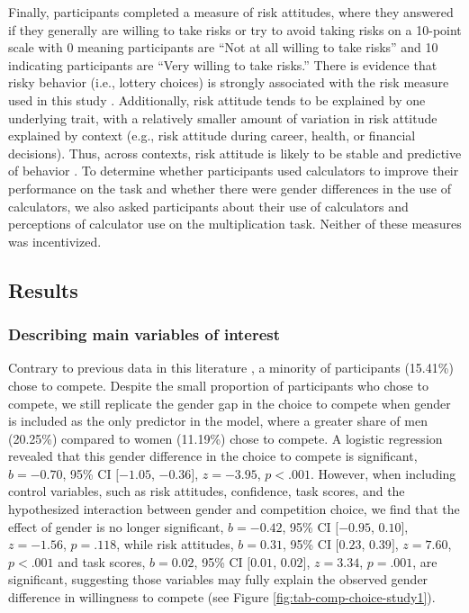 \documentclass[a4paper, nobind]{templates/ociamthesis}
\begin{document}
Finally, participants completed a measure of risk attitudes, where they answered if they generally are willing to take risks or try to avoid taking risks \autocite{Dohmen2011b} on a 10-point scale with 0 meaning participants are ``Not at all willing to take risks'' and 10 indicating participants are ``Very willing to take risks.'' There is evidence that risky behavior (i.e., lottery choices) is strongly associated with the risk measure used in this study \autocite{Dohmen2011b}. Additionally, risk attitude tends to be explained by one underlying trait, with a relatively smaller amount of variation in risk attitude explained by context (e.g., risk attitude during career, health, or financial decisions). Thus, across contexts, risk attitude is likely to be stable and predictive of behavior \autocite{Dohmen2011b}. To determine whether participants used calculators to improve their performance on the task and whether there were gender differences in the use of calculators, we also asked participants about their use of calculators and perceptions of calculator use on the multiplication task. Neither of these measures was incentivized.

\hypertarget{results}{%
\subsection{Results}\label{results}}

\hypertarget{describing-main-variables-of-interest}{%
\subsubsection{Describing main variables of interest}\label{describing-main-variables-of-interest}}

Contrary to previous data in this literature \autocite{Niederle2007}, a minority of participants (15.41\%) chose to compete. Despite the small proportion of participants who chose to compete, we still replicate the gender gap in the choice to compete when gender is included as the only predictor in the model, where a greater share of men (20.25\%) compared to women (11.19\%) chose to compete. A logistic regression revealed that this gender difference in the choice to compete is significant, \(b = -0.70\), 95\% CI \([-1.05\), \(-0.36]\), \(z = -3.95\), \(p < .001\). However, when including control variables, such as risk attitudes, confidence, task scores, and the hypothesized interaction between gender and competition choice, we find that the effect of gender is no longer significant, \(b = -0.42\), 95\% CI \([-0.95\), \(0.10]\), \(z = -1.56\), \(p = .118\), while risk attitudes, \(b = 0.31\), 95\% CI \([0.23\), \(0.39]\), \(z = 7.60\), \(p < .001\) and task scores, \(b = 0.02\), 95\% CI \([0.01\), \(0.02]\), \(z = 3.34\), \(p = .001\), are significant, suggesting those variables may fully explain the observed gender difference in willingness to compete (see Figure \ref{fig:tab-comp-choice-study1}).
\end{document}
